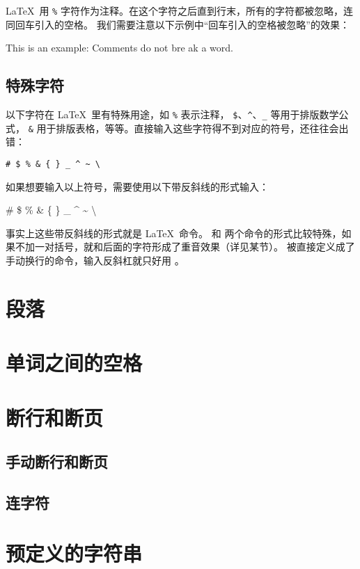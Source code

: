\LaTeX\ 用 \texttt\% 字符作为注释。在这个字符之后直到行末，所有的字符都被忽略，连同回车引入的空格。
我们需要注意以下示例中“回车引入的空格被忽略”的效果：
\begin{example}
This is an %
example: Comments do not bre%
ak a word.
\end{example}

\subsection{特殊字符}\label{subsec:special-chars}

以下字符在 \LaTeX\ 里有特殊用途，如 \texttt\% 表示注释， \texttt\$、\texttt\textasciicircum 、\texttt\_ 等用于排版数学公式，
\texttt\& 用于排版表格，等等。直接输入这些字符得不到对应的符号，还往往会出错：
\begin{verbatim}
# $ % & { } _ ^ ~ \
\end{verbatim}

如果想要输入以上符号，需要使用以下带反斜线的形式输入：
\begin{example}
\# \$ \% \& \{ \} \_ 
\^{} \~{}
\textbackslash
\end{example}

事实上这些带反斜线的形式就是 \LaTeX\ 命令。\cmd{\textasciicircum} 和 \cmd{\textasciitilde} 
两个命令的形式比较特殊，如果不加一对括号，就和后面的字符形成了重音效果（详见某节）。
 被直接定义成了手动换行的命令，输入反斜杠就只好用 。

\section{段落}

\leavevmode\nobreakspace

\section{单词之间的空格}

\leavevmode\nobreakspace

\section{断行和断页}

\leavevmode\nobreakspace

\subsection{手动断行和断页}

\leavevmode\nobreakspace

\subsection{连字符}

\leavevmode\nobreakspace

\section{预定义的字符串}

\leavevmode\nobreakspace

\endinput